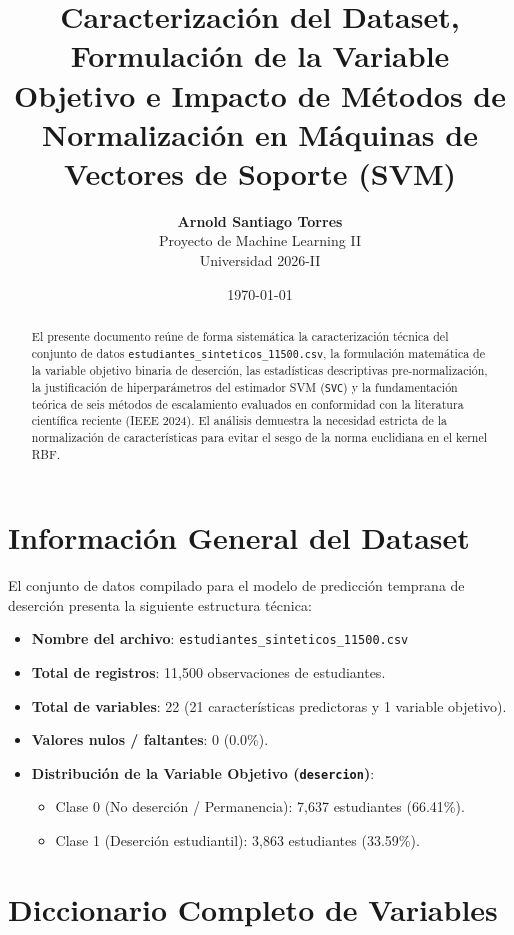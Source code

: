 \documentclass[11pt,a4paper]{article}
\title{\textbf{Caracterización del Dataset, Formulación de la Variable Objetivo e Impacto de Métodos de Normalización en Máquinas de Vectores de Soporte (SVM)}}
\author{\textbf{Arnold Santiago Torres} \\ Proyecto de Machine Learning II \\ Universidad 2026-II}
\date{\today}
\begin{document}
\maketitle

\begin{abstract}
El presente documento reúne de forma sistemática la caracterización técnica del conjunto de datos \texttt{estudiantes\_sinteticos\_11500.csv}, la formulación matemática de la variable objetivo binaria de deserción, las estadísticas descriptivas pre-normalización, la justificación de hiperparámetros del estimador SVM (\texttt{SVC}) y la fundamentación teórica de seis métodos de escalamiento evaluados en conformidad con la literatura científica reciente (IEEE 2024). El análisis demuestra la necesidad estricta de la normalización de características para evitar el sesgo de la norma euclidiana en el kernel RBF.
\end{abstract}

\section{Información General del Dataset}

El conjunto de datos compilado para el modelo de predicción temprana de deserción presenta la siguiente estructura técnica:

\begin{itemize}
    \item \textbf{Nombre del archivo}: \texttt{estudiantes\_sinteticos\_11500.csv}
    \item \textbf{Total de registros}: 11,500 observaciones de estudiantes.
    \item \textbf{Total de variables}: 22 (21 características predictoras y 1 variable objetivo).
    \item \textbf{Valores nulos / faltantes}: 0 (0.0\%).
    \item \textbf{Distribución de la Variable Objetivo (\texttt{desercion})}:
    \begin{itemize}
        \item Clase 0 (No deserción / Permanencia): 7,637 estudiantes (66.41\%).
        \item Clase 1 (Deserción estudiantil): 3,863 estudiantes (33.59\%).
    \end{itemize}
\end{itemize}

\section{Diccionario Completo de Variables}
\end{document}
